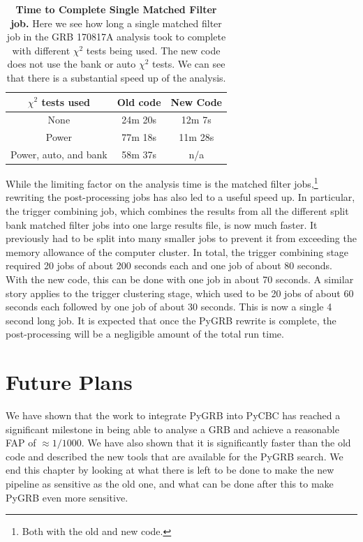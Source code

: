 \documentclass[11pt]{cuthesis}
\begin{document}
\begin{table}[h] \label{tab:inspiral speed}
\centering
\begin{tabular}{  c | c | c }
 $\chi^2$ tests used  & Old code & New Code \\ \hline                                                       
None  & 24m 20s & 12m 7s  \\
Power & 77m 18s & 11m 28s  \\
Power, auto, and bank & 58m 37s & n/a  \\
\end{tabular}
\caption{\textbf{Time to Complete Single Matched Filter job.} Here we see how long a single matched filter job in the GRB 170817A analysis took to complete with different $\chi^2$ tests being used. The new code does not use the bank or auto $\chi^2$ tests. We can see that there is a substantial speed up of the analysis. }
\end{table}

While the limiting factor on the analysis time is the matched filter jobs,\footnote{Both with the old and new code.} rewriting the post-processing jobs has also led to a useful speed up. In particular, the trigger combining job, which combines the results from all the different split bank matched filter jobs into one large results file, is now much faster. It previously had to be split into many smaller jobs to prevent it from exceeding the memory allowance of the computer cluster. In total, the trigger combining stage required 20 jobs of about 200 seconds each and one job of about 80 seconds. With the new code, this can be done with one job in about 70 seconds. A similar story applies to the trigger clustering stage, which used to be 20 jobs of about 60 seconds each followed by one job of about 30 seconds. This is now a single 4 second long job. It is expected that once the PyGRB rewrite is complete, the post-processing will be a negligible amount of the total run time. 


\section{Future Plans}
We have shown that the work to integrate PyGRB into PyCBC has reached a significant milestone in being able to analyse a GRB and achieve a reasonable FAP of $\approx 1/1000$. We have also shown that it is significantly faster than the old code and described the new tools that are available for the PyGRB search. We end this chapter by looking at what there is left to be done to make the new pipeline as sensitive as the old one, and what can be done after this to make PyGRB even more sensitive. 
\end{document}
